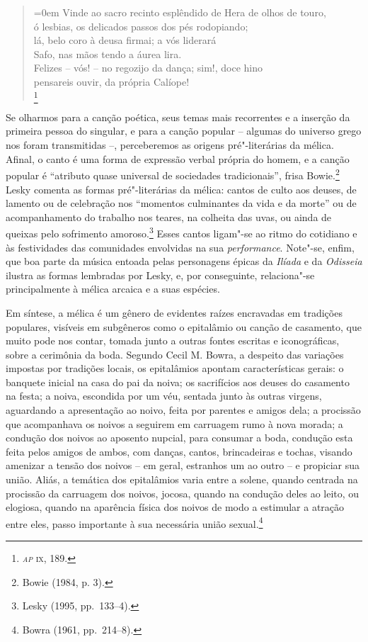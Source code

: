 \begin{quote}\parindent=0em 
Vinde ao sacro recinto esplêndido de Hera de olhos de touro,\\
\hspace*{4.5em} ó lesbias, os delicados passos dos pés rodopiando;\\
lá, belo coro à deusa firmai; a vós liderará\\
\hspace*{4.5em} Safo, nas mãos tendo a áurea lira.\\
Felizes -- vós! -- no regozijo da dança; sim!, doce hino\\
\hspace*{4.5em} pensareis ouvir, da própria Calíope!\\
\mbox{}\hfill{}\footnote{\textsc{\textit{ap} ix}, 189.}
\end{quote}

Se olharmos para a canção poética, seus temas mais recorrentes e a inserção da
primeira pessoa do singular, e para a canção popular -- algumas do universo grego nos
foram transmitidas --, perceberemos as origens pré"-literárias da mélica. Afinal,
o canto é uma forma de expressão verbal própria do homem, e a canção popular é
“atributo quase universal de sociedades tradicionais”, frisa Bowie.\footnote{
Bowie (1984, p. 3).} Lesky comenta as formas
pré"-literárias da mélica: cantos de culto aos deuses, de lamento ou de celebração
nos “momentos culminantes da vida e da morte” ou de acompanhamento do trabalho nos teares, na colheita das uvas, ou ainda de queixas pelo sofrimento amoroso.\footnote{ Lesky (1995, pp.~133--4).} Esses cantos ligam"-se ao ritmo do
cotidiano e às festividades das comunidades envolvidas na sua
\textit{performance}. Note"-se, enfim, que boa parte da música entoada pelas
personagens épicas da \textit{Ilíada} e da \textit{Odisseia} ilustra as formas
lembradas por Lesky, e, por conseguinte, relaciona"-se principalmente à mélica
arcaica e a suas espécies.

Em síntese, a mélica é um gênero de evidentes raízes
encravadas em tradições populares, visíveis em subgêneros
como o epitalâmio ou canção de casamento, que muito pode nos contar, tomada
junto a outras fontes escritas e iconográficas, sobre a cerimônia
da boda. Segundo Cecil M. Bowra, a despeito das variações
impostas por tradições locais, os epitalâmios apontam características gerais:
o banquete inicial na casa do pai da noiva; os sacrifícios aos
deuses do casamento na festa; a noiva, escondida por um véu, sentada junto às
outras virgens, aguardando a apresentação ao noivo, feita por parentes e amigos
dela; a procissão que acompanhava os noivos a seguirem em carruagem rumo à nova
morada; a condução dos noivos ao aposento nupcial, para consumar a boda,
condução esta feita pelos amigos de ambos, com danças, cantos, brincadeiras e
tochas, visando amenizar a tensão dos noivos -- em geral, estranhos um ao outro
-- e propiciar sua união. Aliás, a temática dos epitalâmios varia entre a
solene, quando centrada na procissão da carruagem dos noivos, jocosa, quando na
condução deles ao leito, ou elogiosa, quando na aparência física dos noivos de
modo a estimular a atração entre eles, passo importante à sua necessária união
sexual.\footnote{ Bowra (1961, pp.~214--8).}


